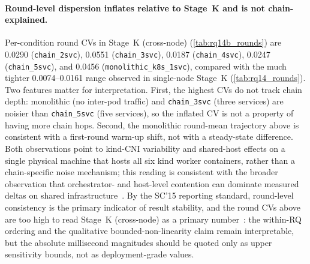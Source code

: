 \paragraph{Round-level dispersion inflates relative to Stage~K and is not chain-explained.}
Per-condition round CVs in Stage~K (cross-node) (\cref{tab:rq14b_rounds}) are
0.0290 (\texttt{chain\_2svc}), 0.0551 (\texttt{chain\_3svc}), 0.0187
(\texttt{chain\_4svc}), 0.0247 (\texttt{chain\_5svc}), and 0.0456
(\texttt{monolithic\_k8s\_1svc}), compared with the much tighter
0.0074--0.0161 range observed in single-node Stage~K
(\cref{tab:rq14_rounds}). Two features matter for interpretation.
First, the highest CVs do not track chain depth: monolithic (no
inter-pod traffic) and \texttt{chain\_3svc} (three services) are
noisier than \texttt{chain\_5svc} (five services), so the inflated
CV is not a property of having more chain hops. Second, the
monolithic round-mean trajectory above is consistent with a
first-round warm-up shift, not with a steady-state difference. Both
observations point to kind-CNI variability and shared-host effects
on a single physical machine that hosts all six kind worker
containers, rather than a chain-specific noise mechanism; this
reading is consistent with the broader observation that orchestrator-
and host-level contention can dominate measured deltas on shared
infrastructure~\cite{noisy_neighbor_k8s}. By the SC'15 reporting
standard, round-level consistency is the primary indicator of result
stability, and the round CVs above are too high to read Stage~K (cross-node) as a
primary number~\cite{benchmarking_sc15}: the within-RQ ordering and
the qualitative bounded-non-linearity claim remain interpretable,
but the absolute millisecond magnitudes should be quoted only as
upper sensitivity bounds, not as deployment-grade values.

